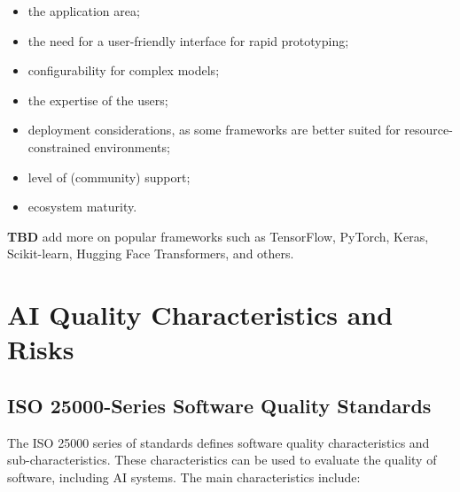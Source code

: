 \documentclass[
  letterpaper,
  DIV=11,
  numbers=noendperiod,
  oneside]{scrreprt}
\begin{document}
\begin{tcolorbox}
\begin{itemize}
\item
  the application area;
\item
  the need for a user-friendly interface for rapid prototyping;
\item
  configurability for complex models;
\item
  the expertise of the users;
\item
  deployment considerations, as some frameworks are better suited for
  resource-constrained environments;
\item
  level of (community) support;
\item
  ecosystem maturity.
\end{itemize}

\textbf{TBD} add more on popular frameworks such as TensorFlow, PyTorch,
Keras, Scikit-learn, Hugging Face Transformers, and others.

\chapter{}\label{section}

\chapter{AI Quality Characteristics and
Risks}\label{ai-quality-characteristics-and-risks}

\section{ISO 25000-Series Software Quality
Standards}\label{sec-iso-25000-overview}

The ISO 25000 series of standards defines software quality
characteristics and sub-characteristics. These characteristics can be
used to evaluate the quality of software, including AI systems. The main
characteristics include:


\end{tcolorbox}
\end{document}
